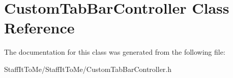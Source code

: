 \hypertarget{interface_custom_tab_bar_controller}{
\section{\-Custom\-Tab\-Bar\-Controller \-Class \-Reference}
\label{interface_custom_tab_bar_controller}
}


\-The documentation for this class was generated from the following file\-:\begin{DoxyCompactItemize}
\item 
\-Staff\-It\-To\-Me/\-Staff\-It\-To\-Me/\-Custom\-Tab\-Bar\-Controller.\-h\end{DoxyCompactItemize}
